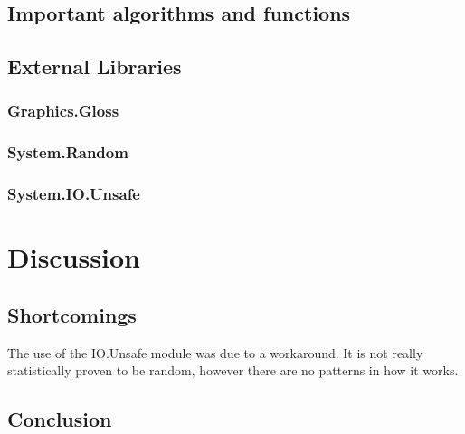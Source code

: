 \documentclass[12pt, a4paper]{article}
\begin{document}
\subsection{Important algorithms and functions}


\subsection{External Libraries}
\subsubsection{Graphics.Gloss}

\subsubsection{System.Random}

\subsubsection{System.IO.Unsafe}


\newpage
\section{Discussion}
\subsection{Shortcomings}
The use of the IO.Unsafe module was due to a workaround. It is not really statistically proven to be random, however there are no patterns in how it works.

\newpage
\subsection{Conclusion}
\end{document}
